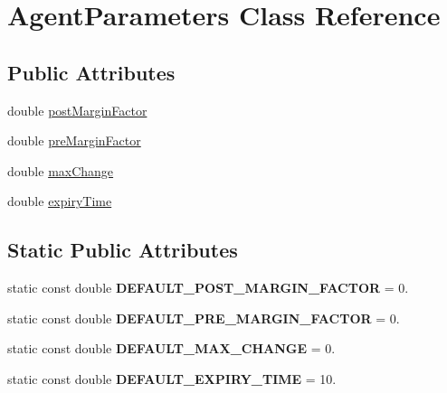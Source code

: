 \hypertarget{class_agent_parameters}{}\section{Agent\+Parameters Class Reference}
\label{class_agent_parameters}
\subsection*{Public Attributes}
\begin{DoxyCompactItemize}
\item 
double \hyperlink{class_agent_parameters_a40865ba74e32db1392f35aa1ee27e0fb}{post\+Margin\+Factor}
\item 
double \hyperlink{class_agent_parameters_a371f2e5668592f4985646456a42e9886}{pre\+Margin\+Factor}
\item 
double \hyperlink{class_agent_parameters_ae50401dd1e8605b30208b6b56a498569}{max\+Change}
\item 
double \hyperlink{class_agent_parameters_a167dbdb2f25f7b6f2ec4af9cfa74a44c}{expiry\+Time}
\end{DoxyCompactItemize}
\subsection*{Static Public Attributes}
\begin{DoxyCompactItemize}
\item 
\mbox{\label{class_agent_parameters_aa5a3b285ccc5b0aa0ed9cc2ef35ae320}} 
static const double {\bfseries D\+E\+F\+A\+U\+L\+T\+\_\+\+P\+O\+S\+T\+\_\+\+M\+A\+R\+G\+I\+N\+\_\+\+F\+A\+C\+T\+OR} = 0.
\item 
\mbox{\label{class_agent_parameters_adc58c8e31e0d7f555ed13969c289ab82}} 
static const double {\bfseries D\+E\+F\+A\+U\+L\+T\+\_\+\+P\+R\+E\+\_\+\+M\+A\+R\+G\+I\+N\+\_\+\+F\+A\+C\+T\+OR} = 0.
\item 
\mbox{\label{class_agent_parameters_a27e7b484bcffed0073a5db41417f8afb}} 
static const double {\bfseries D\+E\+F\+A\+U\+L\+T\+\_\+\+M\+A\+X\+\_\+\+C\+H\+A\+N\+GE} = 0.
\item 
\mbox{\label{class_agent_parameters_a3a575e6aba6448cf79c9829571a0b2b6}} 
static const double {\bfseries D\+E\+F\+A\+U\+L\+T\+\_\+\+E\+X\+P\+I\+R\+Y\+\_\+\+T\+I\+ME} = 10.
\end{DoxyCompactItemize}


